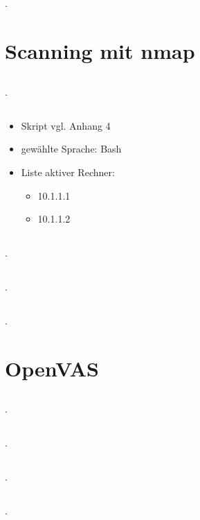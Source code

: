 \documentclass[twoside]{article}
\begin{document}
\subsection{}.


\section{Scanning mit nmap}
\subsection{}.
\subsection{}
\begin{itemize}
	\item Skript vgl. Anhang 4
	\item gewählte Sprache: Bash
	\item Liste aktiver Rechner:
	\begin{itemize}
		\item 10.1.1.1
		\item 10.1.1.2
	\end{itemize}
\end{itemize}
\subsection{}.
\subsection{}.
\subsection{}.


\section{OpenVAS}
\subsection{}.
\subsection{}.
\subsection{}.
\subsection{}.
\end{document}
